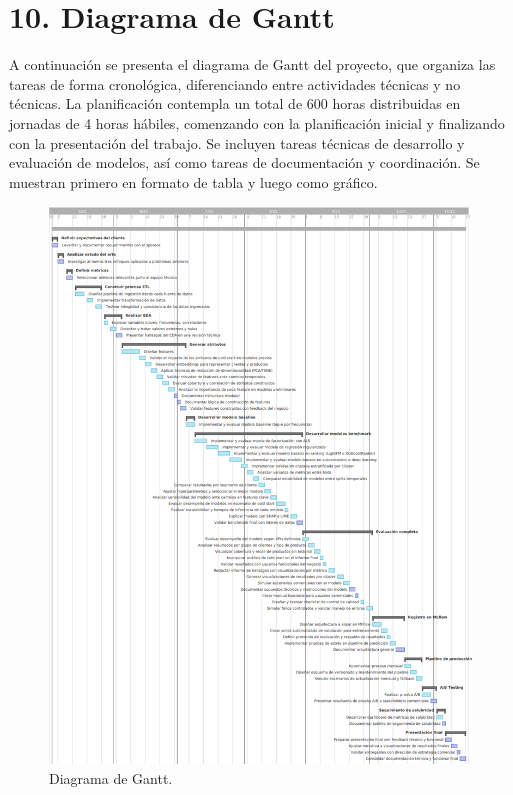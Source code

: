 \documentclass[
11pt, %
]{charter}
\begin{document}
\section{10. Diagrama de Gantt}
\label{sec:gantt}

A continuación se presenta el diagrama de Gantt del proyecto, que organiza las tareas de forma cronológica, diferenciando entre actividades técnicas y no técnicas. La planificación contempla un total de 600 horas distribuidas en jornadas de 4 horas hábiles, comenzando con la planificación inicial y finalizando con la presentación del trabajo. Se incluyen tareas técnicas de desarrollo y evaluación de modelos, así como tareas de documentación y coordinación. Se muestran primero en formato de tabla y luego como gráfico.

\begin{figure}[htpb]
\centering 
\includegraphics[height=.95\textheight]{./Figuras/Gantt.png}
\caption{Diagrama de Gantt.} 
\label{fig:diagGantt}
\end{figure}
\end{document}
